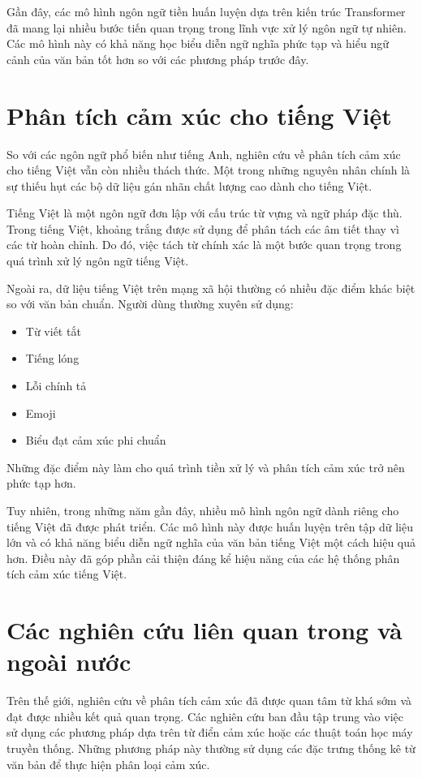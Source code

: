 \documentclass[14pt, a4paper]{report}
\begin{document}
Gần đây, các mô hình ngôn ngữ tiền huấn luyện dựa trên kiến trúc Transformer đã mang lại nhiều bước tiến quan trọng trong lĩnh vực xử lý ngôn ngữ tự nhiên. Các mô hình này có khả năng học biểu diễn ngữ nghĩa phức tạp và hiểu ngữ cảnh của văn bản tốt hơn so với các phương pháp trước đây.

\section{Phân tích cảm xúc cho tiếng Việt}

So với các ngôn ngữ phổ biến như tiếng Anh, nghiên cứu về phân tích cảm xúc cho tiếng Việt vẫn còn nhiều thách thức. Một trong những nguyên nhân chính là sự thiếu hụt các bộ dữ liệu gán nhãn chất lượng cao dành cho tiếng Việt.

Tiếng Việt là một ngôn ngữ đơn lập với cấu trúc từ vựng và ngữ pháp đặc thù. Trong tiếng Việt, khoảng trắng được sử dụng để phân tách các âm tiết thay vì các từ hoàn chỉnh. Do đó, việc tách từ chính xác là một bước quan trọng trong quá trình xử lý ngôn ngữ tiếng Việt.

Ngoài ra, dữ liệu tiếng Việt trên mạng xã hội thường có nhiều đặc điểm khác biệt so với văn bản chuẩn. Người dùng thường xuyên sử dụng:

\begin{itemize}
    \item Từ viết tắt
    \item Tiếng lóng
    \item Lỗi chính tả
    \item Emoji
    \item Biểu đạt cảm xúc phi chuẩn
\end{itemize}

Những đặc điểm này làm cho quá trình tiền xử lý và phân tích cảm xúc trở nên phức tạp hơn.

Tuy nhiên, trong những năm gần đây, nhiều mô hình ngôn ngữ dành riêng cho tiếng Việt đã được phát triển. Các mô hình này được huấn luyện trên tập dữ liệu lớn và có khả năng biểu diễn ngữ nghĩa của văn bản tiếng Việt một cách hiệu quả hơn. Điều này đã góp phần cải thiện đáng kể hiệu năng của các hệ thống phân tích cảm xúc tiếng Việt.

\section{Các nghiên cứu liên quan trong và ngoài nước}

Trên thế giới, nghiên cứu về phân tích cảm xúc đã được quan tâm từ khá sớm và đạt được nhiều kết quả quan trọng. Các nghiên cứu ban đầu tập trung vào việc sử dụng các phương pháp dựa trên từ điển cảm xúc hoặc các thuật toán học máy truyền thống. Những phương pháp này thường sử dụng các đặc trưng thống kê từ văn bản để thực hiện phân loại cảm xúc.
\end{document}
